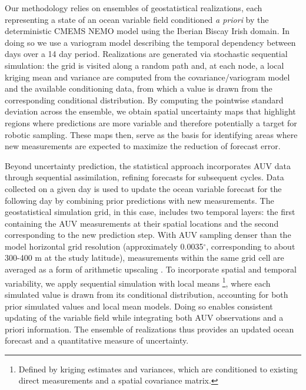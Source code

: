 Our methodology relies on ensembles of geostatistical
  realizations, each representing a state of an ocean variable field
  conditioned \emph{a priori} by the deterministic CMEMS NEMO model
  \parencite{madec97,madec15,CMEMS_IBI_MFC} using the Iberian Biscay Irish
  domain. In doing so we use a variogram model describing the temporal
  dependency between days over a 14 day period. Realizations
  are generated via stochastic sequential simulation: the grid is
  visited along a random path and, at each node, a local kriging mean
  and variance are computed from the covariance/variogram model and
  the available conditioning data, from which a value is drawn from
  the corresponding conditional distribution.  By computing the
pointwise standard deviation across the ensemble, we obtain spatial
uncertainty maps that highlight regions where predictions are more
variable and therefore potentially a target for robotic
sampling. These maps then, serve as the basis for identifying areas
where new measurements are expected to maximize the reduction of
forecast error.

Beyond uncertainty prediction, the statistical approach incorporates
AUV data through sequential assimilation, refining forecasts for
subsequent cycles.  Data collected on a given day is used to update
the ocean variable forecast for the following day by combining prior
predictions with new measurements. The geostatistical simulation grid,
in this case, includes two temporal layers: the first containing the
AUV measurements at their spatial locations and the second
corresponding to the new prediction step. With AUV sampling denser
than the model horizontal grid resolution (approximately
0.0035$^{\circ}$, corresponding to about 300-400 m at the study
latitude), measurements within the same grid cell are averaged as a
form of arithmetic upscaling \parencite{duarte2025}. To incorporate spatial
and temporal variability, we apply sequential simulation with local
means \parencite{soares2001direct}\footnote{Defined by kriging estimates
  and variances, which are conditioned to existing direct measurements
  and a spatial covariance matrix.\cite{cressie93}}, where each
simulated value is drawn from its conditional distribution, accounting
for both prior simulated values and local mean models. Doing so
enables consistent updating of the variable field while integrating
both AUV observations and a priori information. The ensemble of
realizations thus provides an updated ocean forecast and a
quantitative measure of uncertainty.

